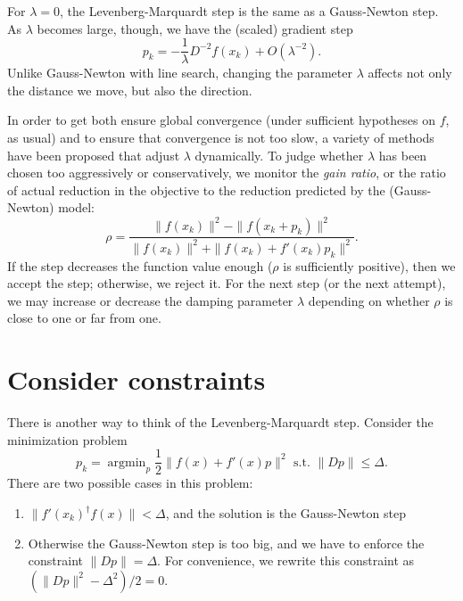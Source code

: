 \documentclass[12pt, leqno]{article} %
\begin{document}
For $\lambda = 0$, the Levenberg-Marquardt step is the same as
a Gauss-Newton step.  As $\lambda$ becomes large, though, we have
the (scaled) gradient step
\[
  p_k = -\frac{1}{\lambda} D^{-2} f(x_k) + O(\lambda^{-2}).
\]
Unlike Gauss-Newton with line search, changing the parameter $\lambda$
affects not only the distance we move, but also the direction.

In order to get both ensure global convergence (under sufficient
hypotheses on $f$, as usual) and to ensure that convergence is not
too slow, a variety of methods have been proposed that adjust
$\lambda$ dynamically.  To judge whether $\lambda$ has been chosen
too aggressively or conservatively, we monitor the {\em gain ratio}, or the
ratio of actual reduction in the objective to the reduction predicted
by the (Gauss-Newton) model:
\[
  \rho =
  \frac{\|f(x_k)\|^2-\|f(x_k+p_k)\|^2}
       {\|f(x_k)\|^2 + \|f(x_k)+f'(x_k)p_k\|^2}.
\]
If the step decreases the function value enough ($\rho$ is
sufficiently positive), then we accept the step; otherwise,
we reject it.  For the next step (or the next attempt), we
may increase or decrease the damping parameter $\lambda$
depending on whether $\rho$ is close to one or far from one.

\section{Consider constraints}

There is another way to think of the Levenberg-Marquardt step.
Consider the minimization problem
\[
  p_k = \operatorname{argmin}_p \frac{1}{2} \|f(x) + f'(x)p \|^2 \mbox{ s.t.~}
  \|Dp\| \leq \Delta.
\]
There are two possible cases in this problem:
\begin{enumerate}
\item $\|f'(x_k)^\dagger f(x)\| < \Delta$, and the solution is the
  Gauss-Newton step
\item Otherwise the Gauss-Newton step is too big, and we have to
  enforce the constraint $\|Dp\| = \Delta$.  For convenience, we
  rewrite this constraint as $(\|Dp\|^2-\Delta^2)/2 = 0$.
\end{enumerate}
\end{document}
